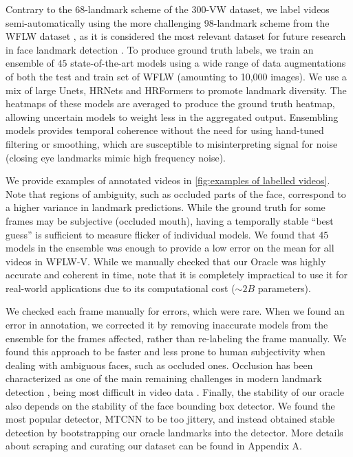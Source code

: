 \documentclass[10pt,twocolumn,letterpaper]{article}
\begin{document}
Contrary to the 68-landmark scheme of the 300-VW dataset, we label videos semi-automatically using the more challenging 98-landmark scheme from the WFLW dataset \cite{Wayne2018LookAtBoundary}, as it is considered the most relevant dataset for future research in face landmark detection \cite{Khabarlak2022FastFacialLandmarkDetectionSurvey1}. To produce ground truth labels, we train an ensemble of $45$ state-of-the-art models using a wide range of data augmentations of both the test and train set of WFLW (amounting to 10,000 images). We use a mix of large Unets, HRNets \cite{Sun2019HRNet} and HRFormers \cite{Yuan2021HRFormer} to promote landmark diversity. The heatmaps of these models are averaged to produce the ground truth heatmap, allowing uncertain models to weight less in the aggregated output. Ensembling models provides temporal coherence without the need for using hand-tuned filtering or smoothing, which are susceptible to misinterpreting signal for noise (\eg closing eye landmarks mimic high frequency noise). 

We provide examples of annotated videos in \cref{fig:examples of labelled videos}. Note that regions of ambiguity, such as occluded parts of the face, correspond to a higher variance in landmark predictions. While the ground truth for some frames may be subjective (\eg occluded mouth), having a temporally stable ``best guess'' is sufficient to measure flicker of individual models. We found that $45$ models in the ensemble was enough to provide a low error on the mean for all videos in WFLW-V. While we manually checked that our Oracle was highly accurate and coherent in time, note that it is completely impractical to use it for real-world applications due to its computational cost ($\sim 2B$ parameters). 

We checked each frame manually for errors, which were rare. When we found an error in annotation, we corrected it by removing inaccurate models from the ensemble for the frames affected, rather than re-labeling the frame manually. We found this approach to be faster and less prone to human subjectivity when dealing with ambiguous faces, such as occluded ones. Occlusion has been characterized as one of the main remaining challenges in modern landmark detection \cite{Wu2019FacialLandmarkDetectionSurvey2}, being most difficult in video data \cite{Shen2015FirstFacialLandmarkTracking}. Finally, the stability of our oracle also depends on the stability of the face bounding box detector. We found the most popular detector, MTCNN \cite{Zhang2017MTCNN} to be too jittery, and instead obtained stable detection by bootstrapping our oracle landmarks into the detector. More details about scraping and curating our dataset can be found in Appendix A.
\end{document}
